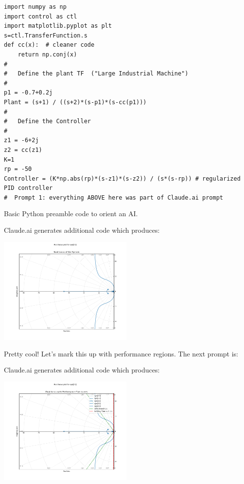 \begin{listing}
    \begin{verbatim}
import numpy as np
import control as ctl
import matplotlib.pyplot as plt
s=ctl.TransferFunction.s
def cc(x):  # cleaner code
    return np.conj(x)
#
#   Define the plant TF  ("Large Industrial Machine")
#
p1 = -0.7+0.2j
Plant = (s+1) / ((s+2)*(s-p1)*(s-cc(p1)))
#
#   Define the Controller
#
z1 = -6+2j
z2 = cc(z1)
K=1
rp = -50
Controller = (K*np.abs(rp)*(s-z1)*(s-z2)) / (s*(s-rp)) # regularized PID controller
#  Prompt 1: everything ABOVE here was part of Claude.ai prompt
\end{verbatim}
  \caption{Basic Python preamble code to orient an AI.}
  \label{lstInitialAIPrompt}
\end{listing}

Claude.ai generates additional code which produces:

\includegraphics[width=0.5\textwidth]{figs09/ClaudeRL_V01.png}

Pretty cool!
Let's mark this up with performance regions.   The next prompt is:



Claude.ai generates additional code which produces:

\includegraphics[width=0.5\textwidth]{figs09/ClaudeRL_V02.png}

